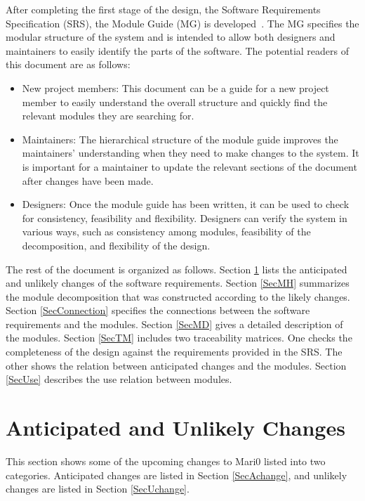 \documentclass[12pt, titlepage]{article}
\begin{document}
After completing the first stage of the design, the Software Requirements
Specification (SRS), the Module Guide (MG) is developed~\citep{ParnasEtAl1984}. The MG
specifies the modular structure of the system and is intended to allow both
designers and maintainers to easily identify the parts of the software.  The
potential readers of this document are as follows:

\begin{itemize}
\item New project members: This document can be a guide for a new project member
  to easily understand the overall structure and quickly find the
  relevant modules they are searching for.
\item Maintainers: The hierarchical structure of the module guide improves the
  maintainers' understanding when they need to make changes to the system. It is
  important for a maintainer to update the relevant sections of the document
  after changes have been made.
\item Designers: Once the module guide has been written, it can be used to
  check for consistency, feasibility and flexibility. Designers can verify the
  system in various ways, such as consistency among modules, feasibility of the
  decomposition, and flexibility of the design.
\end{itemize}

The rest of the document is organized as follows. Section
\ref{SecChange} lists the anticipated and unlikely changes of the software
requirements. Section \ref{SecMH} summarizes the module decomposition that
was constructed according to the likely changes. Section \ref{SecConnection}
specifies the connections between the software requirements and the
modules. Section \ref{SecMD} gives a detailed description of the
modules. Section \ref{SecTM} includes two traceability matrices. One checks
the completeness of the design against the requirements provided in the SRS. The
other shows the relation between anticipated changes and the modules. Section
\ref{SecUse} describes the use relation between modules.

\section{Anticipated and Unlikely Changes} \label{SecChange}
This section shows some of the upcoming changes to Mari0 listed into two categories. 
Anticipated changes are listed in Section \ref{SecAchange}, and
unlikely changes are listed in Section \ref{SecUchange}.
\end{document}
